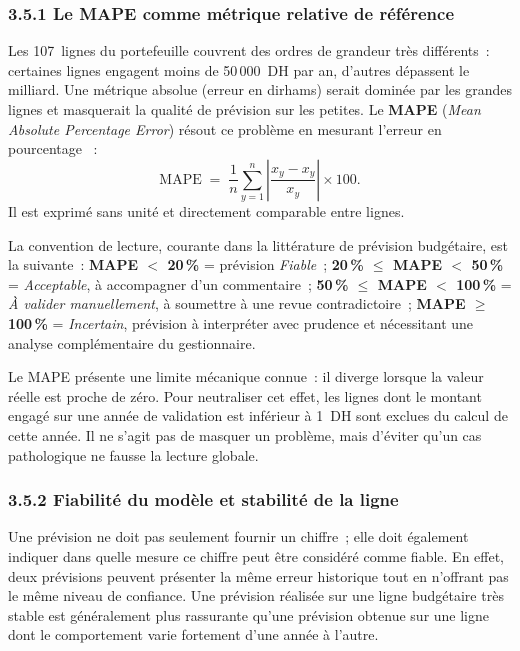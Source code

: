 \subsubsection*{3.5.1 \quad Le MAPE comme m\'etrique relative de r\'ef\'erence}

Les 107~lignes du portefeuille couvrent des ordres de grandeur tr\`es
diff\'erents~: certaines lignes engagent moins de 50\,000~DH par an, d'autres
d\'epassent le milliard. Une m\'etrique absolue (erreur en dirhams) serait
domin\'ee par les grandes lignes et masquerait la qualit\'e de pr\'evision sur
les petites. Le \textbf{MAPE} (\textit{Mean Absolute Percentage Error})
r\'esout ce probl\`eme en mesurant l'erreur en pourcentage \citep{Botchkarev2019}~:
$$
\mathrm{MAPE} \;=\; \frac{1}{n}\sum_{y=1}^{n} \left| \frac{\widehat{x}_y - x_y}{x_y} \right| \times 100.
$$
Il est exprim\'e sans unit\'e et directement comparable entre lignes.

La convention de lecture, courante dans la litt\'erature de pr\'evision
budg\'etaire, est la suivante~: \textbf{MAPE $<$ 20\,\%} = pr\'evision
\emph{Fiable}~; \textbf{20\,\% $\le$ MAPE $<$ 50\,\%} = \emph{Acceptable}, \`a
accompagner d'un commentaire~; \textbf{50\,\% $\le$ MAPE $<$ 100\,\%} =
\emph{\`A valider manuellement}, \`a soumettre \`a une revue contradictoire~;
\textbf{MAPE $\ge$ 100\,\%} = \emph{Incertain}, pr\'evision \`a interpr\'eter
avec prudence et n\'ecessitant une analyse compl\'ementaire du gestionnaire.

Le MAPE pr\'esente une limite m\'ecanique connue~: il diverge lorsque la
valeur r\'eelle est proche de z\'ero. Pour neutraliser cet effet, les lignes
dont le montant engag\'e sur une ann\'ee de validation est inf\'erieur \`a
1~DH sont exclues du calcul de cette ann\'ee. Il ne s'agit pas de masquer un
probl\`eme, mais d'\'eviter qu'un cas pathologique ne fausse la lecture
globale.

\subsubsection*{3.5.2 \quad Fiabilit\'e du mod\`ele et stabilit\'e de la ligne}

Une pr\'evision ne doit pas seulement fournir un chiffre~; elle doit
\'egalement indiquer dans quelle mesure ce chiffre peut \^etre consid\'er\'e
comme fiable. En effet, deux pr\'evisions peuvent pr\'esenter la m\^eme
erreur historique tout en n'offrant pas le m\^eme niveau de confiance. Une
pr\'evision r\'ealis\'ee sur une ligne budg\'etaire tr\`es stable est
g\'en\'eralement plus rassurante qu'une pr\'evision obtenue sur une ligne
dont le comportement varie fortement d'une ann\'ee \`a l'autre.

